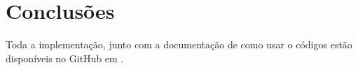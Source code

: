 \section{Conclusões}\label{conclusao}


Toda a implementação, junto com a documentação de como usar o códigos estão disponíveis no GitHub em \cite{repositorio}.
